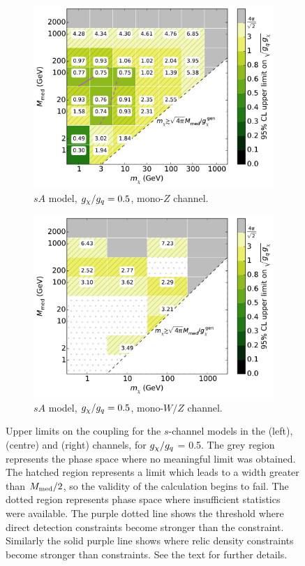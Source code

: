 \begin{figure}
\begin{subfigure}[t]{0.32\textwidth}
    \includegraphics[width=1.\textwidth]{figures/grid_allpoints_SAD_rat05.pdf}
    \caption{$sA$ model, $g_{\chi}/g_q = 0.5$, mono-$Z$ channel.}
  \end{subfigure}
  \begin{subfigure}[t]{0.32\textwidth}
    \centering
    \includegraphics[width=1.\textwidth]{figures/grid_basepoints_SAD_rat05_monoWZ.pdf}
    \caption{$sA$ model, $g_{\chi}/g_q = 0.5$, mono-$W/Z$ channel.}
  \end{subfigure}
  \caption{Upper limits on the coupling for the $s$-channel models in the \monojet (left), \monoZ (centre) and \monoWZ (right) channels, for $g_{\chi} / g_q$ = 0.5. The grey region represents the phase space where no meaningful limit was obtained. The hatched region represents a limit which leads to a width greater than $M_{\mathrm{med}} / 2$, so the validity of the calculation begins to fail. The dotted region represents phase space where insufficient statistics were available. The purple dotted line shows the threshold where direct detection constraints become stronger than the \monoX constraint. Similarly the solid purple line shows where relic density constraints become stronger than \monoX constraints. See the text for further details.}
  \label{fig:results_sVsA_rat05}
\end{figure}

